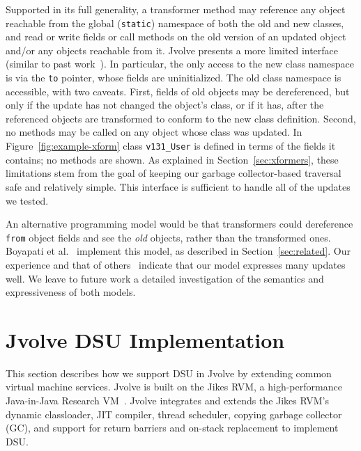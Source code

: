 \documentclass[9pt]{sigplanconf}
\newcommand{\DSU}{{\sc Jvolve}}
\newcommand{\JikesRVM}{Jikes RVM}
\begin{document}
Supported in its full generality, a transformer method may
reference any object reachable from the global ({\tt static})
namespace of both the old and new classes, and read or write fields or
call methods on the old version of an updated object and/or any
objects reachable from it.  \DSU{} presents a more limited interface
(similar to past work~\cite{ritzau00dynamic,Mala00a}).
In particular, the only access to the new class namespace is via the
{\tt to} pointer, whose fields are uninitialized. The old class
namespace is accessible, 
with two caveats.  First, fields of old objects may be dereferenced,
but only if the update has not changed the object's class, or if it has, after
the referenced objects are transformed to conform to the new class
definition.  Second, no methods may be called on any object whose
class was updated.  In Figure~\ref{fig:example-xform}
class {\tt v131\_User} is defined in terms of the fields it
contains; no methods are shown.  As explained in
Section~\ref{sec:xformers}, these limitations stem from the goal of keeping
our garbage collector-based traversal safe and relatively simple.
This interface is sufficient to handle all of the updates we tested.

An alternative programming model would be that transformers could dereference
\texttt{from} object fields and see the \emph{old} objects, rather than the
transformed ones.  Boyapati et al.~\cite{boyapati03lazy} implement this
model, as described in Section~\ref{sec:related}. Our experience and that of
others~\cite{k42usenix,neamtiu06dsu,neamtiu09stump,upstare} indicate
that our model expresses many updates well.  We leave to future work a
detailed investigation of the semantics and expressiveness of both
models.



\section{\DSU{} DSU Implementation}
\label{sec:vm}

This section describes how we support DSU in \DSU{} by extending
common virtual machine services.  \DSU{} is built on the
\JikesRVM{},
a high-performance Java-in-Java Research VM~\cite{AAB+:99,VMperf:webpage}.
\DSU{} integrates and extends the \JikesRVM{}'s dynamic classloader,
JIT compiler, thread scheduler, copying garbage collector (GC), and
support for return barriers and on-stack replacement to implement DSU\@.  
\end{document}
